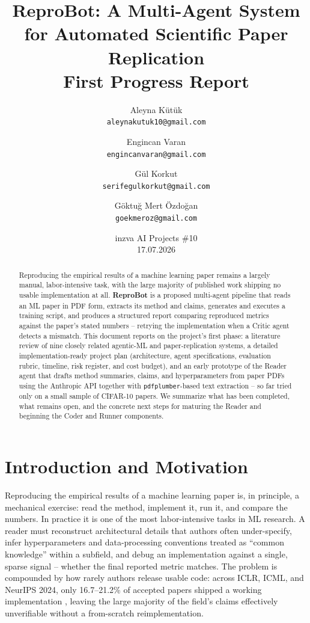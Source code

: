 \documentclass[11pt]{article}
\title{\textbf{ReproBot: A Multi-Agent System for Automated Scientific Paper Replication}\\[0.4em]
\large First Progress Report}
\author{
  Aleyna Kütük \\ \small\texttt{aleynakutuk10@gmail.com}
  \and
  Engincan Varan \\ \small\texttt{engincanvaran@gmail.com}
  \and
  Gül Korkut \\ \small\texttt{serifegulkorkut@gmail.com}
  \and
  Göktuğ Mert Özdoğan \\ \small\texttt{goekmeroz@gmail.com}
}
\date{inzva AI Projects \#10 \\ 17.07.2026}
\begin{document}
\maketitle

\begin{abstract}
Reproducing the empirical results of a machine learning paper remains a largely manual,
labor-intensive task, with the large majority of published work shipping no usable
implementation at all. \textbf{ReproBot} is a proposed multi-agent pipeline that reads
an ML paper in PDF form, extracts its method and claims, generates and executes a
training script, and produces a structured report comparing reproduced metrics against
the paper's stated numbers -- retrying the implementation when a Critic agent detects a
mismatch. This document reports on the project's first phase: a literature review of
nine closely related agentic-ML and paper-replication systems, a detailed
implementation-ready project plan (architecture, agent specifications, evaluation
rubric, timeline, risk register, and cost budget), and an early prototype of the Reader
agent that drafts method summaries, claims, and hyperparameters from paper PDFs using the
Anthropic API together with \texttt{pdfplumber}-based text extraction -- so far tried only
on a small sample of CIFAR-10 papers. We summarize what has been completed, what remains
open, and the concrete next steps for maturing the Reader and beginning the Coder and
Runner components.
\end{abstract}

\section{Introduction and Motivation}
\label{sec:intro}

Reproducing the empirical results of a machine learning paper is, in principle, a
mechanical exercise: read the method, implement it, run it, and compare the numbers.
In practice it is one of the most labor-intensive tasks in ML research. A reader must
reconstruct architectural details that authors often under-specify, infer
hyperparameters and data-processing conventions treated as ``common knowledge'' within a
subfield, and debug an implementation against a single, sparse signal -- whether the
final reported metric matches. The problem is compounded by how rarely authors release
usable code: across ICLR, ICML, and NeurIPS 2024, only 16.7--21.2\% of accepted papers
shipped a working implementation \cite{seo2025papercoder}, leaving the large majority of
the field's claims effectively unverifiable without a from-scratch reimplementation.
\end{document}

